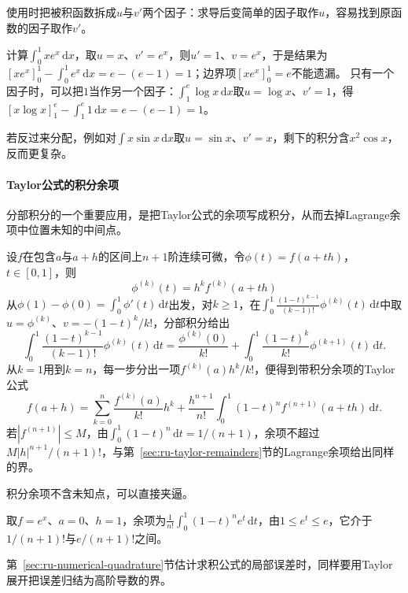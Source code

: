 使用时把被积函数拆成$u$与$v'$两个因子：求导后变简单的因子取作$u$，容易找到原函数的因子取作$v'$。


\begin{example}[分部积分的两个算例]
\label{ex:ru-integration-by-parts}
计算$\int_0^1xe^x\,\mathrm dx$，取$u=x$、$v'=e^x$，则$u'=1$、$v=e^x$，于是结果为$[xe^x]_0^1-\int_0^1e^x\,\mathrm dx=e-(e-1)=1$；边界项$[xe^x]_0^1=e$不能遗漏。
只有一个因子时，可以把$1$当作另一个因子：$\int_1^e\log x\,\mathrm dx$取$u=\log x$、$v'=1$，得$[x\log x]_1^e-\int_1^e1\,\mathrm dx=e-(e-1)=1$。
\end{example}
若反过来分配，例如对$\int x\sin x\,\mathrm dx$取$u=\sin x$、$v'=x$，剩下的积分含$x^2\cos x$，反而更复杂。

\paragraph{Taylor公式的积分余项}
分部积分的一个重要应用，是把Taylor公式的余项写成积分，从而去掉Lagrange余项中位置未知的中间点。

设$f$在包含$a$与$a+h$的区间上$n+1$阶连续可微，令$\phi(t)=f(a+th)$，$t\in[0,1]$，则
\[
  \phi^{(k)}(t)=h^kf^{(k)}(a+th)
\]
从$\phi(1)-\phi(0)=\int_0^1\phi'(t)\,\mathrm dt$出发，对$k\geq1$，在$\int_0^1\frac{(1-t)^{k-1}}{(k-1)!}\phi^{(k)}(t)\,\mathrm dt$中取$u=\phi^{(k)}$、$v=-(1-t)^k/k!$，分部积分给出
\[
 \int_0^1\frac{(1-t)^{k-1}}{(k-1)!}\phi^{(k)}(t)\,\mathrm dt=\frac{\phi^{(k)}(0)}{k!}+\int_0^1\frac{(1-t)^k}{k!}\phi^{(k+1)}(t)\,\mathrm dt.
\]
从$k=1$用到$k=n$，每一步分出一项$f^{(k)}(a)h^k/k!$，便得到带积分余项的Taylor公式
\begin{equation}
 f(a+h)=\sum_{k=0}^n\frac{f^{(k)}(a)}{k!}h^k+\frac{h^{n+1}}{n!}\int_0^1(1-t)^nf^{(n+1)}(a+th)\,\mathrm dt.
 \label{eq:ru-taylor-integral-remainder}
\end{equation}
\BookEquationAliases{\label{eq:analysis-taylor-integral-remainder}}
若$|f^{(n+1)}|\leq M$，由$\int_0^1(1-t)^n\,\mathrm dt=1/(n+1)$，余项不超过$M|h|^{n+1}/(n+1)!$，与第~\ref{sec:ru-taylor-remainders}节的Lagrange余项给出同样的界。

积分余项不含未知点，可以直接夹逼。
\begin{example}[指数函数积分余项的夹逼]
\label{ex:ru-exp-integral-remainder}
取$f=e^x$、$a=0$、$h=1$，余项为$\frac1{n!}\int_0^1(1-t)^ne^t\,\mathrm dt$，由$1\leq e^t\leq e$，它介于$1/(n+1)!$与$e/(n+1)!$之间。
\end{example}

第~\ref{sec:ru-numerical-quadrature}节估计求积公式的局部误差时，同样要用Taylor展开把误差归结为高阶导数的界。
